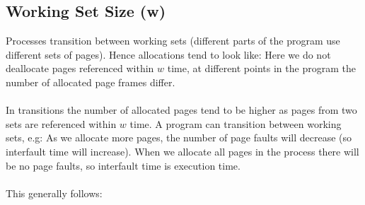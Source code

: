 \documentclass{report}
\begin{document}
        \subsection*{Working Set Size (w)}
            Processes transition between working sets (different parts of the program use different sets of pages). Hence allocations tend to look like:
            Here we do not deallocate pages referenced within $w$ time, at different points in the program the number of allocated page frames differ. 
            \\
            \\ In transitions the number of allocated pages tend to be higher as pages from two sets are referenced within $w$ time.
            A program can transition between working sets, e.g:
            As we allocate more pages, the number of page faults will decrease (so interfault time will increase). When we allocate all pages in the process there will be no page faults, so interfault time is execution time.
            \\
            \\ This generally follows:
        
\end{document}
